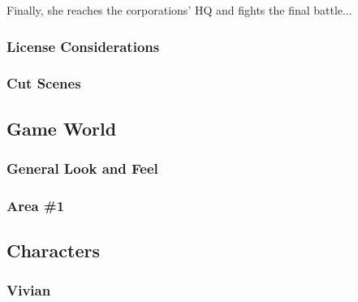 \documentclass[12pt,titlepage]{article}
\newcounter{subsubsubsection}[subsubsection]
\begin{document}
Finally, she reaches the corporations' HQ and fights the final battle...

\subsubsection{License Considerations}

\subsubsection{Cut Scenes}




\subsection{Game World}

\subsubsection{General Look and Feel}

\subsubsection{Area \#1}


\subsection{Characters}

\subsubsection{Vivian}

\end{document}
